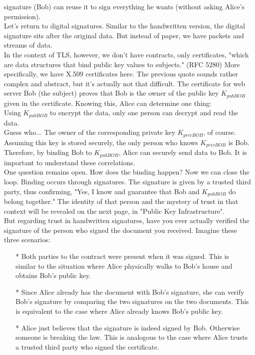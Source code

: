 signature (Bob) can reuse it to sign everything he wants (without asking Alice's permission).
\\
Let's return to digital signatures. Similar to the handwritten version, the digital 
signature sits after the original data. But instead of paper, we have packets and streams 
of data.
\\
In the context of TLS, however, we don't have contracts, only certificates, "which are 
data structures that bind public key values to subjects." (RFC 5280) More specifically, 
we have X.509 certificates here. The previous quote sounds rather complex and abstract, 
but it's actually not that difficult. The certificate for web server Bob (the subject) 
proves that Bob is the owner of the public key $K_{pubBOB}$ given in the certificate. 
Knowing this, Alice can determine one thing:
\\
Using $K_{pubBOB}$ to encrypt the data, only one person can decrypt and read the data.
\\
Guess who... The owner of the corresponding private key $K_{privBOB}$, of course. 
Assuming this key is stored securely, the only person who knows $K_{privBOB}$ is Bob. 
Therefore, by binding Bob to $K_{pubBOB}$, Alice can securely send data to Bob. It is 
important to understand these correlations.
\\
One question remains open. How does the binding happen? Now we can close the loop. 
Binding occurs through signatures. The signature is given by a trusted third party, 
thus confirming, "Yes, I know and guarantee that Bob and $K_{pubBOB}$ do belong together." 
The identity of that person and the mystery of trust in that context will be revealed 
on the next page, in "Public Key Infrastructure".
\\
But regarding trust in handwritten signatures, have you ever actually verified the 
signature of the person who signed the document you received. Imagine these three scenarios:
\begin{itemize}
    \item[*] Both parties to the contract were present when it was signed. This is similar to the situation where Alice physically walks to Bob's house and obtains Bob's public key.
    \item[*] Since Alice already has the document with Bob's signature, she can verify Bob's signature by comparing the two signatures on the two documents. This is equivalent to the case where Alice already knows Bob's public key.
    \item[*] Alice just believes that the signature is indeed signed by Bob. Otherwise someone is breaking the law. This is analogous to the case where Alice trusts a trusted third party who signed the certificate.
\end{itemize}

